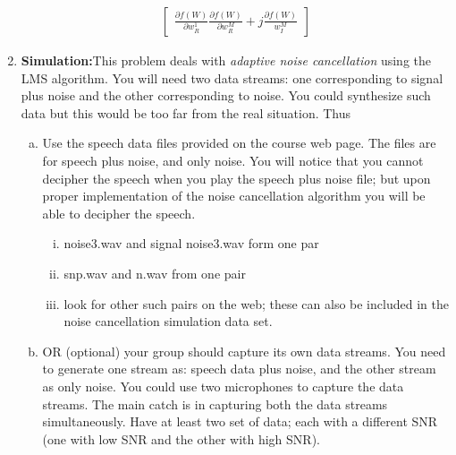 \documentclass[journal,12pt,twocolumn]{IEEEtran}
\begin{document}
\begin{enumerate}
\begin{align*}
\begin{bmatrix}{\frac{\partial{f(W)}}{\partial{w}_R^1}}
{\frac{\partial{f(W)}}{\partial{w}_R^M}}+{j\frac{\partial{f(W)}}{{w}_I^M}}
\end{bmatrix}
\end{align*}
%
\item \textbf{Simulation:}This problem deals with \textit{adaptive noise cancellation} using the LMS algorithm. You will need two data streams: one corresponding to signal plus noise and the other corresponding to noise. You could synthesize such
data but this would be too far from the real situation. Thus
%
\begin{enumerate}[(a)]
\item Use the speech data files provided on the course web page.
%
The files are for speech plus noise, and only noise. You will notice that you cannot decipher the speech when you play the speech plus noise file; but upon proper implementation of the noise cancellation algorithm you will be able to decipher the speech.
\begin{enumerate}[i.]
%
\item noise3.wav and signal noise3.wav form one par
\item snp.wav and n.wav from one pair
\item look for other such pairs on the web; these can also be included in the noise cancellation simulation data
set.
\end{enumerate}
%
\item OR (optional) your group should capture its own data streams.
You need to generate one stream as: speech data plus noise, and the other stream as only noise. You could
use two microphones to capture the data streams. The main catch is in capturing both the data streams simultaneously.
Have at least two set of data; each with a different SNR (one with low SNR and the other with high SNR).
\end{enumerate}
\end{enumerate}
\end{document}
